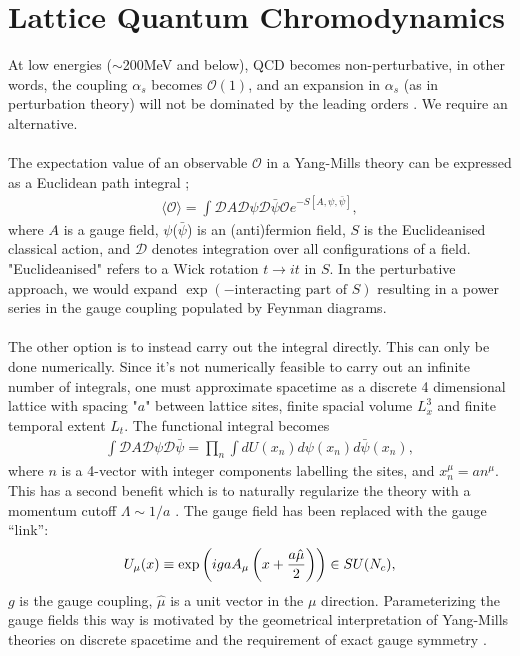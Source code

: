 \chapter{Lattice Quantum Chromodynamics}
\label{chap:latticeqcd}

{}

At low energies ($\sim$200MeV and below), QCD becomes non-perturbative, in other words, the coupling $\alpha_s$ becomes $\mathcal{O}(1)$, and an expansion in $\alpha_s$ (as in perturbation theory) will not be dominated by the leading orders \cite{Schwartz:2013pla}. We require an alternative.
\\ \\
The expectation value of an observable $\mathcal{O}$ in a Yang-Mills theory can be expressed as a Euclidean path integral \cite{Lepage:1998dt};
\begin{align}
 \langle \mathcal{O} \rangle = \int \mathcal{D}A\mathcal{D}\psi\mathcal{D}\bar{\psi} \mathcal{O} e^{-S[A,\psi,\bar{\psi}]},
\end{align}
where $A$ is a gauge field, $\psi$($\bar{\psi}$) is an (anti)fermion field, $S$ is the Euclideanised classical action, and $\mathcal{D}$ denotes integration over all configurations of a field. "Euclideanised" refers to a Wick rotation $t\to it$ in $S$. In the perturbative approach, we would expand $\exp(-\text{interacting part of }S )$ resulting in a power series in
the gauge coupling populated by Feynman diagrams.
\\ \\
The other option is to instead carry out the integral directly. This can only be done numerically.
 Since it's not numerically feasible to carry out an infinite number of integrals, one must approximate spacetime as a discrete 4 dimensional lattice with spacing "$a$" between lattice sites, finite spacial volume $L_x^3$ and finite temporal extent $L_t$. The functional integral becomes
\begin{align}
 \int \mathcal{D}A\mathcal{D}\psi\mathcal{D}\bar{\psi} = \prod_{n} \int dU(x_n) d\psi(x_n) d\bar{\psi}(x_n),
\end{align}
where $n$ is a 4-vector with integer components labelling the sites, and $x_n^{\mu} = an^{\mu}$.
This has a second benefit which is to naturally regularize the theory with a momentum cutoff $\Lambda \sim 1/a$ \cite{Lepage:1998dt}. The gauge field has been replaced with the gauge
``link'':
\begin{align}
U_{\mu}(x) \equiv \exp\left(igaA_{\mu}\left(x+{a\hat{\mu}\over2}\right)\right) \in SU(N_c),
\end{align}
$g$ is the gauge coupling, $\hat{\mu}$ is a unit vector in the $\mu$ direction. Parameterizing the gauge fields this way is motivated by the geometrical interpretation of Yang-Mills theories on discrete spacetime and the requirement of exact gauge symmetry \cite{Munster:2000ez}.

